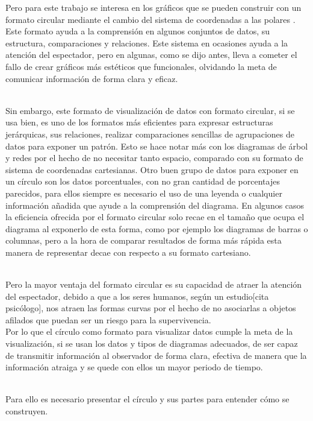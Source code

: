 \documentclass{article}\usepackage[]{graphicx}\usepackage[]{color}
\begin{document}
Pero para este trabajo se interesa en los gr\'aficos que se pueden construir con un formato circular mediante el cambio del sistema de coordenadas a las polares\cite{coord_polar}
. Este formato ayuda a la comprensi\'on en algunos conjuntos de datos, su estructura, comparaciones y relaciones. Este sistema en ocasiones ayuda a la atenci\'on del espectador, pero en algunas, como se dijo antes, lleva a cometer el fallo de crear gr\'aficos m\'as est\'eticos que funcionales, olvidando la meta de comunicar informaci\'on de forma clara y eficaz.~\\~\par
Sin embargo, este formato de visualizaci\'on de datos con formato circular, si se usa bien, es uno de los formatos m\'as eficientes para expresar estructuras jer\'arquicas, sus relaciones, realizar comparaciones sencillas de agrupaciones de datos para exponer un patr\'on. Esto se hace notar m\'as con los diagramas de \'arbol y redes por el hecho de no necesitar tanto espacio, comparado con su formato de sistema de coordenadas cartesianas. Otro buen grupo de datos para exponer en un c\'irculo son los datos porcentuales, con no gran cantidad de porcentajes parecidos, para ellos siempre es necesario el uso de una leyenda o cualquier informaci\'on a\~nadida que ayude a la comprensi\'on del diagrama.
\clearpage
En algunos casos la eficiencia ofrecida por el formato circular solo recae en el tama\~no que ocupa el diagrama al exponerlo de esta forma, como por ejemplo los diagramas de barras o columnas, pero a la hora de comparar resultados de forma m\'as r\'apida esta manera de representar decae con respecto a su formato cartesiano.~\\~\par
Pero la mayor ventaja del formato circular es su capacidad de atraer la atenci\'on del espectador, debido a que a los seres humanos, seg\'un un estudio[cita psic\'ologo], nos atraen las formas curvas por el hecho de no asociarlas a objetos afilados que puedan ser un riesgo para la supervivencia.~\\
Por lo que el c\'irculo como formato para visualizar datos cumple la meta de la visualizaci\'on, si se usan los datos y tipos de diagramas adecuados, de ser capaz de transmitir informaci\'on al observador de forma clara, efectiva de manera que la informaci\'on atraiga y se quede con ellos un mayor periodo de tiempo.~\\~\par
Para ello es necesario presentar el c\'irculo y sus partes para entender c\'omo se construyen.
~\\
\end{document}
